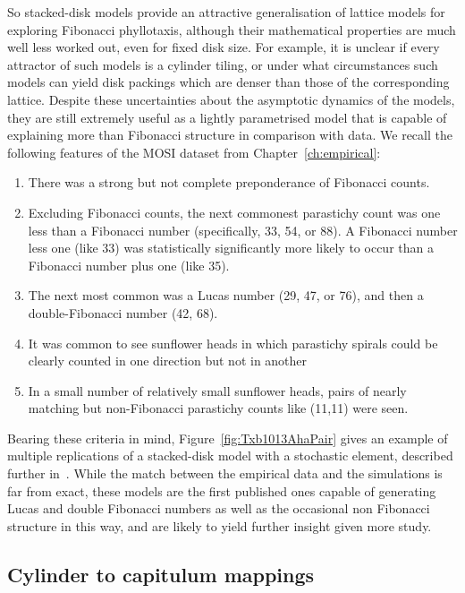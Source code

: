So stacked-disk models provide an attractive generalisation of lattice models for exploring Fibonacci phyllotaxis, although their mathematical properties are much well less worked out, even for fixed disk size.  For example,  it is unclear if every attractor of such models is a cylinder tiling, or under what circumstances
such models can yield disk packings which are denser than those of the corresponding lattice. Despite these uncertainties about the asymptotic dynamics of the models, they are still extremely useful as a lightly parametrised model that is capable of explaining more than Fibonacci structure in comparison with data.
We recall the following features of the MOSI dataset from Chapter~\ref{ch:empirical}:

\begin{enumerate}
	\item There was a strong but not complete preponderance of Fibonacci counts.
	\item	Excluding Fibonacci counts, the next commonest parastichy count was one less than a Fibonacci number (specifically, 33, 54, or 88).  A Fibonacci number less one (like 33) was statistically significantly more likely to occur than a Fibonacci number plus one (like 35).
	\item The next most common was a Lucas number (29, 47, or 76), and then a double-Fibonacci number (42, 68).
	\item It was common to see sunflower heads in which parastichy spirals could be clearly counted in one direction but not in another
	\item In a small number of relatively small sunflower heads, pairs of nearly matching but non-Fibonacci parastichy counts like (11,11)  were seen.
\end{enumerate}

Bearing these criteria in mind, Figure~\ref{fig:Txb1013AhaPair} gives an example of multiple replications of a stacked-disk model with a stochastic element, described further in~\cite{swintonDiskstackingModelsAre2024}. While the match between the empirical data and the simulations is far from exact, these models are the first published ones capable of generating Lucas and double Fibonacci numbers as well as the occasional non Fibonacci structure in this way, and are likely to yield further insight given more study. 



\subsection{Cylinder to capitulum mappings}

